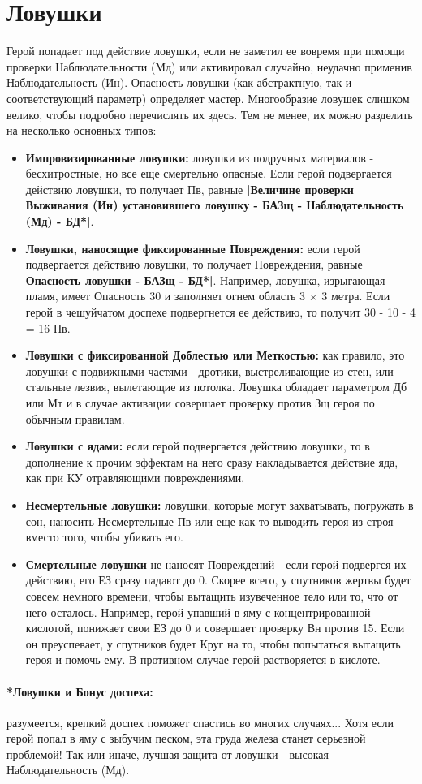 \section{Ловушки}
Герой попадает под действие ловушки, если не заметил ее вовремя при помощи проверки Наблюдательности (Мд) или активировал случайно, неудачно применив Наблюдательность (Ин). Опасность ловушки (как абстрактную, так и соответствующий параметр) определяет мастер. Многообразие ловушек слишком велико, чтобы подробно перечислять их здесь. Тем не менее, их можно разделить на несколько основных типов:
\begin{itemize}
\item \textbf{Импровизированные ловушки:} ловушки из подручных материалов - бесхитростные, но все еще смертельно опасные. Если герой подвергается действию ловушки, то получает Пв, равные \textbf{|Величине проверки Выживания (Ин) установившего ловушку - БАЗщ - Наблюдательность (Мд) - БД*|}.
\item \textbf{Ловушки, наносящие фиксированные Повреждения:} если герой подвергается действию ловушки, то получает Повреждения, равные \textbf{|Опасность ловушки - БАЗщ - БД*|}. Например, ловушка, изрыгающая пламя, имеет Опасность 30 и заполняет огнем область 3 × 3 метра. Если герой в чешуйчатом доспехе подвергнется ее действию, то получит 30 - 10 - 4 = 16 Пв.
\item \textbf{Ловушки с фиксированной Доблестью или Меткостью:} как правило, это ловушки с подвижными частями - дротики, выстреливающие из стен, или стальные лезвия, вылетающие из потолка. Ловушка обладает параметром Дб или Мт и в случае активации совершает проверку против Зщ героя по обычным правилам.
\item \textbf{Ловушки с ядами:} если герой подвергается действию ловушки, то в дополнение к прочим эффектам на него сразу накладывается действие яда, как при КУ отравляющими повреждениями.
\item \textbf{Несмертельные ловушки:} ловушки, которые могут захватывать, погружать в сон, наносить Несмертельные Пв или еще как-то выводить героя из строя вместо того, чтобы убивать его.
\item \textbf{Смертельные ловушки} не наносят Повреждений - если герой подвергся их действию, его ЕЗ сразу падают до 0. Скорее всего, у спутников жертвы будет совсем немного времени, чтобы вытащить изувеченное тело или то, что от него осталось. Например, герой упавший в яму с концентрированной кислотой, понижает свои ЕЗ до 0 и совершает проверку Вн против 15. Если он преуспевает, у спутников будет Круг на то, чтобы попытаться вытащить героя и помочь ему. В противном случае герой растворяется в кислоте.
\end{itemize}
\paragraph{*Ловушки и Бонус доспеха:} разумеется, крепкий доспех поможет спастись во многих случаях... Хотя если герой попал в яму с зыбучим песком, эта груда железа станет серьезной проблемой! Так или иначе, лучшая защита от ловушки - высокая Наблюдательность (Мд).